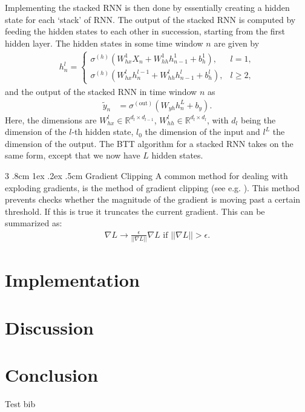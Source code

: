 \documentclass[%
reprint,
amsmath,amssymb,
aps,
]{revtex4-2}
\makeatletter
\renewcommand{\subsubsection}{%
	\@startsection
	{subsubsection}%
	{3}%
	{\z@}%
	{.8cm \@plus1ex \@minus .2ex}%
	{.5cm}%
	{\normalfont\small\centering}%
}
\makeatother
\begin{document}
Implementing the stacked RNN is then done by essentially creating a hidden state for each `stack' of RNN. The output of the stacked RNN is computed by feeding the hidden states to each other in succession, starting from the first hidden layer. The hidden states in some time window \(n\) are given by
\begin{align}
	h^{l}_{n} = \begin{cases}
		\sigma^{(h)}\left( W_{hx}^{1}X_{n} + W_{hh}^{1}h_{n-1}^{1} + b_{h}^{1}\right), &l=1, \\
		\sigma^{(h)}\left( W_{hx}^{l}h_{n}^{l-1} + W_{hh}^{l}h_{n-1}^{l} + b_{h}^{l}\right), &l\geq 2,
	\end{cases}
\end{align}	
and the output of the stacked RNN in time window \(n\) as
\begin{align}
	\tilde{y}_{n} &= \sigma^{(\text{out})}\left( W_{yh}h^{L}_{n} + b_{y} \right).
\end{align}
Here, the dimensions are \(W^{l}_{hx}\in\mathbb{R}^{d_{l}\times d_{l-1}}\), \(W^{l}_{hh}\in\mathbb{R}^{d_{l}\times d_{l}}\), with \(d_l\) being the dimension of the \(l\)-th hidden state, \(l_0\) the dimension of the input and \(l^{L}\) the dimension of the output. The BTT algorithm for a stacked RNN takes on the same form, except that we now have \(L\) hidden states. 

\subsubsection{Gradient Clipping}
A common method for dealing with exploding gradients, is the method of gradient clipping (see e.g. \cite{Goodfellow-et-al-2016}). This method prevents checks whether the magnitude of the gradient is moving past a certain threshold. If this is true it truncates the current gradient. This can be summarized as:
\begin{align}
	\nabla L \rightarrow \frac{\epsilon}{||\nabla L||}\nabla L \text{ if } ||\nabla L|| > \epsilon.
\end{align}

\section{Implementation}


\section{Discussion}

\section{Conclusion}
Test bib \cite{Planck:2018vyg}



	
\end{document}
